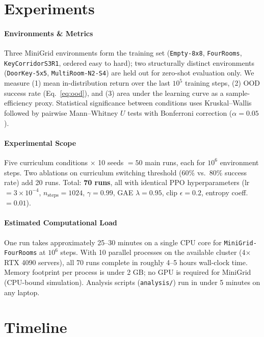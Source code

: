 \documentclass{article}
\begin{document}
\section{Experiments}

\paragraph{Environments \& Metrics}
Three MiniGrid environments form the training set (\texttt{Empty-8x8}, \texttt{FourRooms}, \texttt{KeyCorridorS3R1}, ordered easy to hard); two structurally distinct environments (\texttt{DoorKey-5x5}, \texttt{MultiRoom-N2-S4}) are held out for zero-shot evaluation only.
We measure (1) mean in-distribution return over the last $10^5$ training steps, (2) OOD success rate (Eq.~\ref{eq:ood}), and (3) area under the learning curve as a sample-efficiency proxy.
Statistical significance between conditions uses Kruskal--Wallis followed by pairwise Mann--Whitney $U$ tests with Bonferroni correction ($\alpha = 0.05$).

\paragraph{Experimental Scope}
Five curriculum conditions $\times$ 10 seeds $= 50$ main runs, each for $10^6$ environment steps.
Two ablations on curriculum switching threshold (60\% vs.\ 80\% success rate) add 20 runs.
Total: \textbf{70 runs}, all with identical PPO hyperparameters (lr $= 3\times10^{-4}$, $n_\text{steps}=1024$, $\gamma=0.99$, GAE $\lambda=0.95$, clip $\epsilon=0.2$, entropy coeff.\ $= 0.01$).

\paragraph{Estimated Computational Load}
One run takes approximately 25--30 minutes on a single CPU core for \texttt{MiniGrid-FourRooms} at $10^6$ steps.
With 10 parallel processes on the available cluster (4$\times$RTX 4090 servers), all 70 runs complete in roughly 4--5 hours wall-clock time.
Memory footprint per process is under 2 GB; no GPU is required for MiniGrid (CPU-bound simulation).
Analysis scripts (\texttt{analysis/}) run in under 5 minutes on any laptop.

\section{Timeline}
\end{document}
